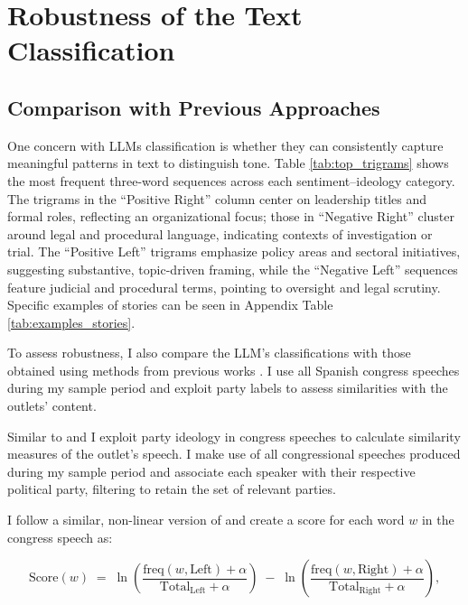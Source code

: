 \documentclass[12pt]{article}
\begin{document}
\section{Robustness of the Text Classification}

\label{sec:robustness}







\subsection{Comparison with Previous Approaches}


One concern with LLMs classification is whether they can consistently capture meaningful patterns in text to distinguish tone. Table \ref{tab:top_trigrams} shows the most frequent three-word sequences across each sentiment–ideology category. The trigrams in the “Positive Right” column center on leadership titles and formal roles, reflecting an organizational focus; those in “Negative Right” cluster around legal and procedural language, indicating contexts of investigation or trial. The “Positive Left” trigrams emphasize policy areas and sectoral initiatives, suggesting substantive, topic-driven framing, while the “Negative Left” sequences feature judicial and procedural terms, pointing to oversight and legal scrutiny. Specific examples of stories can be seen in Appendix Table \ref{tab:examples_stories}.


To assess robustness, I also compare the LLM’s classifications with those obtained using methods from previous works \citep{gentzkow2010media,laver2003extracting}. I use all Spanish congress speeches during my sample period and exploit party labels to assess similarities with the outlets’ content. 


Similar to \cite{gentzkow2010media} and \cite{laver2003extracting} I exploit party ideology in congress speeches to calculate similarity measures of the outlet's speech. I make use of all congressional speeches produced during my sample period and associate each speaker with their respective political party, filtering to retain the set of relevant parties.

I follow a similar, non-linear version of \cite{laver2003extracting} and create a score for each word $w$ in the congress speech as: 



\begin{equation}
	\text{Score}(w) \;=\; \ln \left( \frac{\mathrm{freq}(w,\text{Left}) + \alpha}{\mathrm{Total}_{\text{Left}} + \alpha} \right) \;-\; \ln \left( \frac{\mathrm{freq}(w,\text{Right}) + \alpha}{\mathrm{Total}_{\text{Right}} + \alpha} \right),
	\label{eq:log_ratio}
\end{equation}
\end{document}

